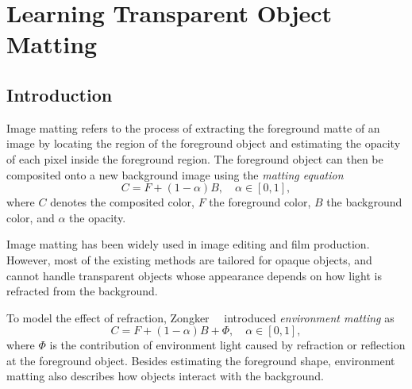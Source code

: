 \newcommand{\TOMNetTrimap}{TOM-Net$^{\text{+Trimap}}$\xspace}
\newcommand{\TOMNetBg}{TOM-Net$^{\text{+Bg}}$\xspace}
\chapter{Learning Transparent Object Matting}
\label{ch:tomnet}

\section{Introduction}
Image matting refers to the process of extracting the foreground matte of an image by locating the region of the foreground object and estimating the opacity of each pixel inside the foreground region. The foreground object can then be composited onto a new background image using the \emph{matting equation}~\cite{smith1996blue} 
\begin{equation}
    \label{eq:alphamatte}
    C = F + (1-\alpha)B,  \quad \alpha \in [0, 1],
\end{equation}
where $C$ denotes the composited color, $F$ the foreground color, $B$ the background color, and $\alpha$ the opacity.

Image matting has been widely used in image editing and film production. However, most of the existing methods are tailored for opaque objects, and cannot handle transparent objects whose appearance depends on how light is refracted from the background.

To model the effect of refraction, Zongker~\etal~\cite{zongker1999environment} introduced \emph{environment matting} as 
\begin{equation}
    \label{eq:em_general}
    C = F + (1-\alpha)B + \Phi, \quad \alpha \in [0, 1],
\end{equation}
where $\Phi$ is the contribution of environment light caused by refraction or reflection at the foreground object. Besides estimating the foreground shape, environment matting also describes how objects interact with the background. 


